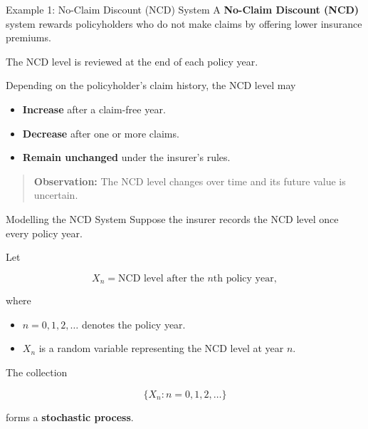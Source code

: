 \documentclass[
  ignorenonframetext,
  aspectratio=169,
]{beamer}
\providecommand{\tightlist}{%
  \setlength{\itemsep}{0pt}\setlength{\parskip}{0pt}}
\begin{document}
\begin{frame}{Example 1: No-Claim Discount (NCD) System}
\protect{}\label{example-1-no-claim-discount-ncd-system}
A \textbf{No-Claim Discount (NCD)} system rewards policyholders who do
not make claims by offering lower insurance premiums.

The NCD level is reviewed at the end of each policy year.

Depending on the policyholder's claim history, the NCD level may

\begin{itemize}
\tightlist
\item
  \textbf{Increase} after a claim-free year.
\item
  \textbf{Decrease} after one or more claims.
\item
  \textbf{Remain unchanged} under the insurer's rules.
\end{itemize}

\begin{quote}
\textbf{Observation:} The NCD level changes over time and its future
value is uncertain.
\end{quote}
\end{frame}

\begin{frame}{Modelling the NCD System}
\protect{}\label{modelling-the-ncd-system}
Suppose the insurer records the NCD level once every policy year.

Let

\[
X_n=\text{NCD level after the }n\text{th policy year},
\]

where

\begin{itemize}
\tightlist
\item
  \(n=0,1,2,\ldots\) denotes the policy year.
\item
  \(X_n\) is a random variable representing the NCD level at year \(n\).
\end{itemize}

The collection

\[
\{X_n:n=0,1,2,\ldots\}
\]

forms a \textbf{stochastic process}.
\end{frame}
\end{document}
